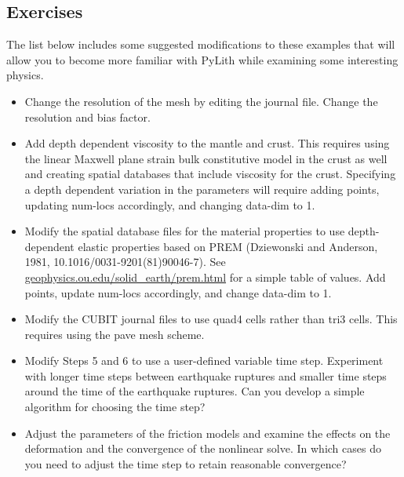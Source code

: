 \subsection{Exercises}

The list below includes some suggested modifications to these examples
that will allow you to become more familiar with PyLith while
examining some interesting physics.
\begin{itemize}
\item Change the resolution of the mesh by editing the 
  journal file. Change the resolution and bias factor.
\item Add depth dependent viscosity to the mantle and crust. This requires
  using the linear Maxwell plane strain bulk constitutive model in the
  crust as well and creating spatial databases that include viscosity
  for the crust. Specifying a depth dependent variation in the parameters
  will require adding points, updating num-locs accordingly, and changing
  data-dim to 1.
\item Modify the spatial database files for the material properties to use
  depth-dependent elastic properties based on PREM (Dziewonski and Anderson,
  1981, 10.1016/0031-9201(81)90046-7). See \url{geophysics.ou.edu/solid_earth/prem.html}
  for a simple table of values. Add points, update num-locs accordingly,
  and change data-dim to 1.
\item Modify the CUBIT journal files to use quad4 cells rather than tri3
  cells. This requires using the pave mesh scheme.
\item Modify Steps 5 and 6 to use a user-defined variable time
  step. Experiment with longer time steps between earthquake ruptures
  and smaller time steps around the time of the earthquake
  ruptures. Can you develop a simple algorithm for choosing the time step?
\item Adjust the parameters of the friction models and examine the
  effects on the deformation and the convergence of the nonlinear
  solve. In which cases do you need to adjust the time step to retain
  reasonable convergence?
\end{itemize}


